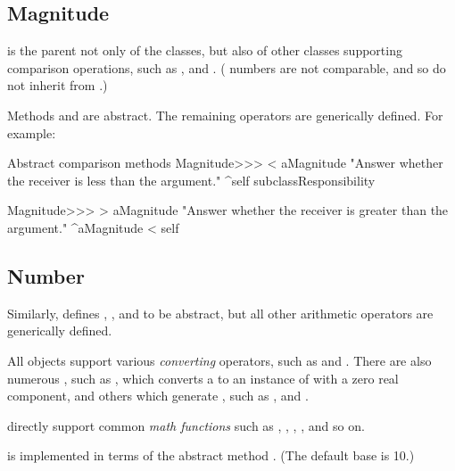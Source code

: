 \documentclass[a4paper,10pt,twoside]{book}
\begin{document}
\subsection{Magnitude}

 is the parent not only of the  classes, but also of other classes supporting comparison operations, such as ,  and .  ( numbers are not comparable, and so do not inherit from .)

Methods  and  are abstract. The remaining operators are generically defined. For example:

\begin{method}{Abstract comparison methods}
Magnitude>>> < aMagnitude 
    "Answer whether the receiver is less than the argument."
    ^self subclassResponsibility

Magnitude>>> > aMagnitude 
    "Answer whether the receiver is greater than the argument."
    ^aMagnitude < self
\end{method}

\subsection{Number}

Similarly,  defines , ,  and  to be abstract, but all other arithmetic operators are generically defined.

All  objects support various \emph{converting} operators, such as  and . There are also numerous , such as , which converts a  to an instance of  with a zero real component, and others which generate , such as ,  and .

 directly support common \emph{math functions} such as , , , ,  and so on.

 is implemented in terms of the abstract method . (The default base is 10.)
\end{document}
